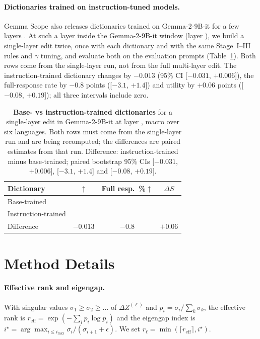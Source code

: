 \paragraph{Dictionaries trained on instruction-tuned models.}
Gemma Scope also releases dictionaries trained on Gemma-2-9B-it for a few layers \citep{lieberum2024gemmascopeopensparse}. At such a layer inside the Gemma-2-9B-it window (layer ), we build a single-layer \foxp edit twice, once with each dictionary and with the same Stage~I--III rules and $\gamma$ tuning, and evaluate both on the \nocue evaluation prompts (Table~\ref{tab:app-it-sae}). Both rows come from the single-layer run, not from the full multi-layer edit. The instruction-trained dictionary changes  by $-0.013$ (95\% CI [$-0.031$, $+0.006$]), the full-response rate by $-0.8$ points ([$-3.1$, $+1.4$]) and utility by $+0.06$ points ([$-0.08$, $+0.19$]); all three intervals include zero.

\begin{table}[!htbp]
  \centering
  \footnotesize
  \begin{tabular}{@{}lccc@{}}
    \toprule
    \textbf{Dictionary} & \textbf{}$\uparrow$ & \textbf{Full resp.\ \%}$\uparrow$ & \textbf{$\Delta S$} \\
    \midrule
    Base-trained          & \res{?} & \res{?} & \res{?} \\
    Instruction-trained   & \res{?} & \res{?} & \res{?} \\
    \midrule
    Difference            & $-0.013$ & $-0.8$ & $+0.06$ \\
    \bottomrule
  \end{tabular}
  \caption{\textbf{Base- vs instruction-trained dictionaries} for a single-layer edit in Gemma-2-9B-it at layer , macro over six languages. Both rows must come from the single-layer run and are being recomputed; the differences are paired estimates from that run. Difference: instruction-trained minus base-trained; paired bootstrap 95\% CIs [$-0.031$, $+0.006$], [$-3.1$, $+1.4$] and [$-0.08$, $+0.19$].}
  \label{tab:app-it-sae}
\end{table}

\FloatBarrier
\section{Method Details}
\label{app:stage2}

\paragraph{Effective rank and eigengap.}
With singular values $\sigma_1\ge\sigma_2\ge\dots$ of $\Delta Z^{(\ell)}$ and $p_i=\sigma_i/\sum_k\sigma_k$, the effective rank is $r_{\mathrm{eff}}=\exp(-\sum_i p_i\log p_i)$ and the eigengap index is $i^\star=\arg\max_{i\le i_{\max}}\sigma_i/(\sigma_{i+1}+\epsilon)$. We set $r_\ell=\min(\lceil r_{\mathrm{eff}}\rceil,i^\star)$.

